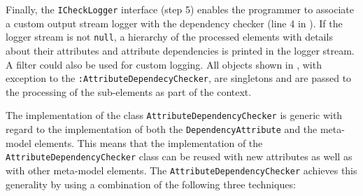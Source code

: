 Finally, the \texttt{ICheck\-Logger} interface (step 5) enables the programmer to associate a custom output stream logger with the dependency checker (line 4 in ). If the logger stream is not \texttt{null}, a hierarchy of the processed elements with details about their attri\-bu\-tes and attri\-bu\-te dependencies is printed in the logger stream. A filter could also be used for custom logging. All objects shown in , with exception to the  \texttt{:Attri\-bu\-te\-De\-pende\-cyChe\-cker}, are singletons and are passed to the processing of the sub-elements as part of the context. 

The implementation of the class \texttt{Attri\-bu\-te\-De\-pe\-ndency\-Che\-cker} is generic with regard to the implementation of both the \texttt{De\-pe\-ndency\-Attri\-bu\-te} and the meta-model elements. This means that the implementation of the \texttt{Attri\-bu\-te\-De\-pe\-ndency\-Che\-cker} class can be reused with new attributes as well as with other meta-model elements. The \texttt{Attri\-bu\-te\-De\-pe\-ndency\-Che\-cker} achieves this generality by using a combination of the following three techniques:

